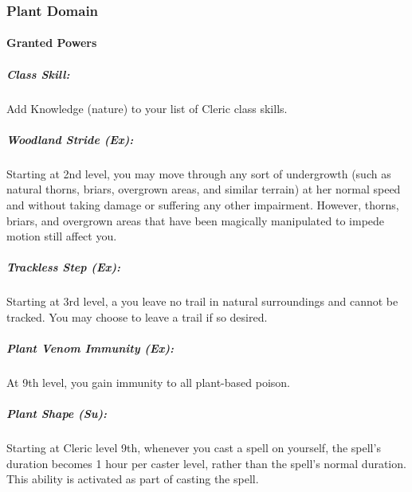 \subsubsection{Plant Domain}
\paragraph{Granted Powers}
\subparagraph{Class Skill:}
Add Knowledge (nature) to your list of Cleric class skills.
\subparagraph{Woodland Stride (Ex):}
Starting at 2nd level, you may move through any sort of undergrowth (such as natural thorns, briars, overgrown areas, and similar terrain) at her normal speed and without taking damage or suffering any other impairment. However, thorns, briars, and overgrown areas that have been magically manipulated to impede motion still affect you.
\subparagraph{Trackless Step (Ex):}
Starting at 3rd level, a you leave no trail in natural surroundings and cannot be tracked. You may choose to leave a trail if so desired.
\subparagraph{Plant Venom Immunity (Ex):}
At 9th level, you gain immunity to all plant-based poison.
\subparagraph{Plant Shape (Su):}
Starting at Cleric level 9th, whenever you cast a  spell on yourself, the spell's duration becomes 1 hour per caster level, rather than the spell's normal duration.
This ability is activated as part of casting the spell.
